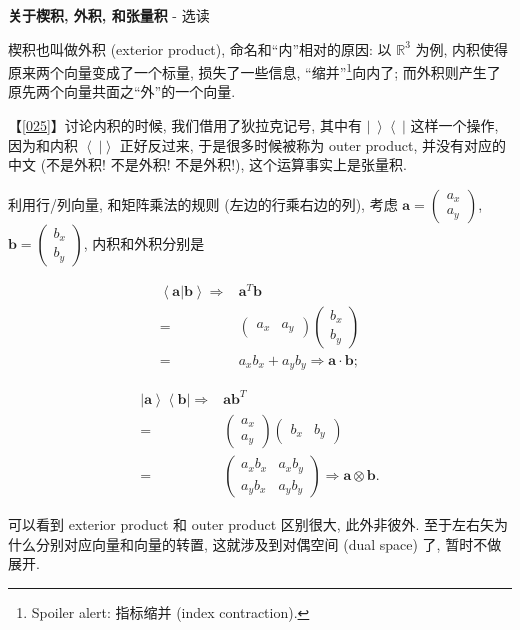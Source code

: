 \begin{newquote}

\textbf{关于楔积, 外积, 和张量积} - 选读

楔积也叫做外积 (exterior product), 命名和``内''相对的原因: 以
\(\mathbb{R}^3\) 为例, 内积使得原来两个向量变成了一个标量,
损失了一些信息, ``缩并''\footnote{Spoiler alert: 指标缩并 (index
  contraction).}向内了;
而外积则产生了原先两个向量共面之``外''的一个向量.

【\ref{025}】讨论内积的时候, 我们借用了狄拉克记号, 其中有
\(\left|\ \right>\left<\ \right|\) 这样一个操作, 因为和内积
\(\left<\ \right|\left.\right>\) 正好反过来, 于是很多时候被称为 outer
product, 并没有对应的中文 (不是外积! 不是外积! 不是外积!),
这个运算事实上是张量积.

利用行/列向量, 和矩阵乘法的规则 (左边的行乘右边的列), 考虑
$\boldsymbol{a}=\begin{pmatrix}a_x\\a_y\end{pmatrix}$,
$\boldsymbol{b}=\begin{pmatrix}b_x\\b_y\end{pmatrix}$, 内积和外积分别是

\begin{align*}
\left<{\boldsymbol{a}}\right|\left.\boldsymbol{b}\right>\Rightarrow&\boldsymbol{a}^T\boldsymbol{b}\\
=&\begin{pmatrix}a_x&a_y\end{pmatrix}\begin{pmatrix}b_x\\b_y\end{pmatrix}\\
=&a_xb_x+a_yb_y\Rightarrow\boldsymbol{a}\cdot\boldsymbol{b};
\end{align*}

\begin{align*}
\left|{\boldsymbol{a}}\right>\left<{\boldsymbol{b}}\right|\Rightarrow&\boldsymbol{a}\boldsymbol{b}^T\\
=&\begin{pmatrix}a_x\\a_y\end{pmatrix}\begin{pmatrix}b_x&b_y\end{pmatrix}\\
=&\begin{pmatrix}a_xb_x&a_xb_y\\a_yb_x&a_yb_y\end{pmatrix}\Rightarrow{\boldsymbol{a}}\otimes{\boldsymbol{b}}.
\end{align*}

可以看到 exterior product 和 outer product 区别很大, 此外非彼外.
至于左右矢为什么分别对应向量和向量的转置, 这就涉及到对偶空间 (dual
space) 了, 暂时不做展开.

\end{newquote}